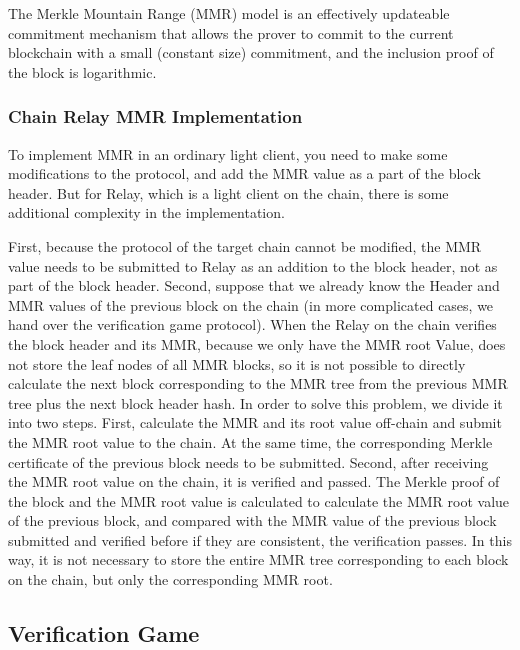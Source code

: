 The Merkle Mountain Range (MMR) model is an effectively updateable commitment mechanism that allows the prover to commit to the current blockchain with a small (constant size) commitment, and the inclusion proof of the block is logarithmic.


\subsubsection*{Chain Relay MMR Implementation}

To implement MMR in an ordinary light client, you need to make some modifications to the protocol, and add the MMR value as a part of the block header. But for Relay, which is a light client on the chain, there is some additional complexity in the implementation.

First, because the protocol of the target chain cannot be modified, the MMR value needs to be submitted to Relay as an addition to the block header, not as part of the block header. Second, suppose that we already know the Header and MMR values ​​of the previous block on the chain (in more complicated cases, we hand over the verification game protocol). When the Relay on the chain verifies the block header and its MMR, because we only have the MMR root Value, does not store the leaf nodes of all MMR blocks, so it is not possible to directly calculate the next block corresponding to the MMR tree from the previous MMR tree plus the next block header hash. In order to solve this problem, we divide it into two steps. First, calculate the MMR and its root value off-chain and submit the MMR root value to the chain. At the same time, the corresponding Merkle certificate of the previous block needs to be submitted. Second, after receiving the MMR root value on the chain, it is verified and passed. The Merkle proof of the block and the MMR root value is calculated to calculate the MMR root value of the previous block, and compared with the MMR value of the previous block submitted and verified before if they are consistent, the verification passes. In this way, it is not necessary to store the entire MMR tree corresponding to each block on the chain, but only the corresponding MMR root.


\subsection*{Verification Game}

